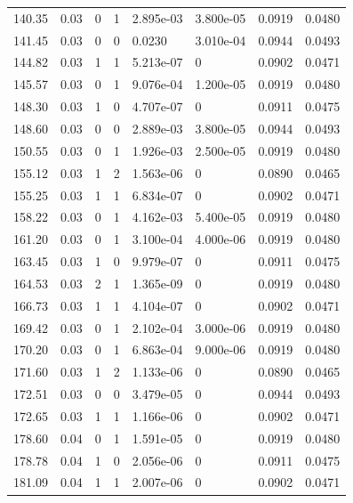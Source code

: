 \documentclass[preview]{standalone}
\begin{document}
{{{\begin{tabular}{L{1.2cm}C{1.2cm} C{0.3cm}C{0.5cm} C{1.4cm}C{1.4cm} C{1.4cm}C{1.4cm}}
  140.35  &  0.03  & 0     &  1 &  2.895e-03  & 3.800e-05  & 0.0919 &  0.0480   \\ 
  141.45  &  0.03  & 0     &  0 &  0.0230  & 3.010e-04  & 0.0944 &  0.0493   \\ 
  144.82  &  0.03  & 1     &  1 &  5.213e-07  & 0  & 0.0902 &  0.0471   \\ 
  145.57  &  0.03  & 0     &  1 &  9.076e-04  & 1.200e-05  & 0.0919 &  0.0480   \\ 
  148.30  &  0.03  & 1     &  0 &  4.707e-07  & 0  & 0.0911 &  0.0475   \\ 
  148.60  &  0.03  & 0     &  0 &  2.889e-03  & 3.800e-05  & 0.0944 &  0.0493   \\ 
  150.55  &  0.03  & 0     &  1 &  1.926e-03  & 2.500e-05  & 0.0919 &  0.0480   \\ 
  155.12  &  0.03  & 1     &  2 &  1.563e-06  & 0  & 0.0890 &  0.0465   \\ 
  155.25  &  0.03  & 1     &  1 &  6.834e-07  & 0  & 0.0902 &  0.0471   \\ 
  158.22  &  0.03  & 0     &  1 &  4.162e-03  & 5.400e-05  & 0.0919 &  0.0480   \\ 
  161.20  &  0.03  & 0     &  1 &  3.100e-04  & 4.000e-06  & 0.0919 &  0.0480   \\ 
  163.45  &  0.03  & 1     &  0 &  9.979e-07  & 0  & 0.0911 &  0.0475   \\ 
  164.53  &  0.03  & 2     &  1 &  1.365e-09  & 0  & 0.0919 &  0.0480   \\ 
  166.73  &  0.03  & 1     &  1 &  4.104e-07  & 0  & 0.0902 &  0.0471   \\ 
  169.42  &  0.03  & 0     &  1 &  2.102e-04  & 3.000e-06  & 0.0919 &  0.0480   \\ 
  170.20  &  0.03  & 0     &  1 &  6.863e-04  & 9.000e-06  & 0.0919 &  0.0480   \\ 
  171.60  &  0.03  & 1     &  2 &  1.133e-06  & 0  & 0.0890 &  0.0465   \\ 
  172.51  &  0.03  & 0     &  0 &  3.479e-05  & 0  & 0.0944 &  0.0493   \\ 
  172.65  &  0.03  & 1     &  1 &  1.166e-06  & 0  & 0.0902 &  0.0471   \\ 
  178.60  &  0.04  & 0     &  1 &  1.591e-05  & 0  & 0.0919 &  0.0480   \\ 
  178.78  &  0.04  & 1     &  0 &  2.056e-06  & 0  & 0.0911 &  0.0475   \\ 
  181.09  &  0.04  & 1     &  1 &  2.007e-06  & 0  & 0.0902 &  0.0471   \\ 

\end{tabular}}}}
\end{document}
